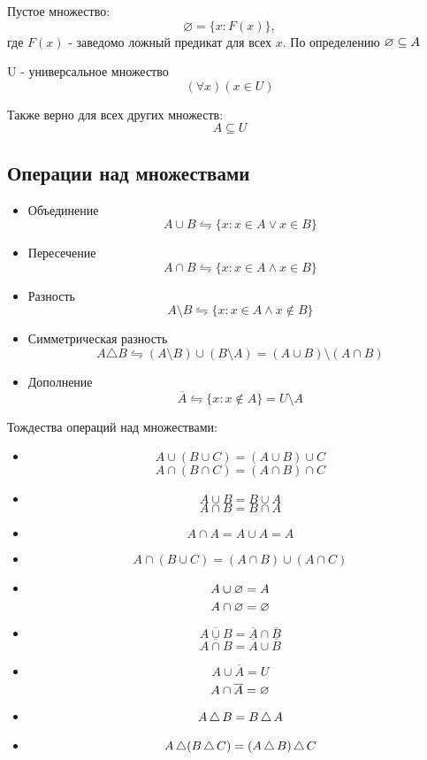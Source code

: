 \medskip

\begin{definition}
Пустое множество:
\[
\varnothing = \{x: F(x)\},
\]
где $F(x)$ - заведомо ложный предикат для всех  $x$.
По определению $\varnothing \subseteq A$
\end{definition}


\begin{definition}
U - универсальное множество \[
	(\forall x)(x \in U)
\]

Также верно для всех других множеств: \[
A \subseteq U
\] 
\end{definition}

\subsection{Операции над множествами}
\begin{itemize}
\item Объединение \[
A \cup B \leftrightharpoons \{x: x \in A \lor x \in B\}
\]
\item Пересечение \[
A \cap B \leftrightharpoons \{x: x \in A \land x \in B\} 
\] 
\item Разность \[
A \setminus B \leftrightharpoons \{x: x \in A \land x \not\in B\} 
\]
\item Симметрическая разность \[
A \triangle B \leftrightharpoons (A\setminus B) \cup (B \setminus A) = (A \cup B) \setminus (A\cap B)
\] 
\item Дополнение \[
\overline{A} \leftrightharpoons \{x:x \not\in A\} = U \setminus A 
\] 
\end{itemize}

\medskip

Тождества операций над множествами:
\begin{itemize}
	\item \[
	A \cup (B \cup C) = (A \cup B) \cup C
	\]
	\[
	A \cap (B \cap C) = (A \cap B) \cap C
	\]
\item \[
A \cup B = B \cup A
\] 
\[
A \cap B = B \cap A
\]
\item \[
A \cap A = A \cup A = A
\] 
\item \[
A \cap (B \cup C) = (A \cap B) \cup (A \cap C)
\]
\item \[
A \cup \varnothing = A
\] 
\[
A \cap \varnothing = \varnothing
\]
\item \[
\overline{A \cup B} = \overline{A} \cap	\overline{B}
\] 
\[
\overline{A \cap B} = \overline{A} \cup \overline{B}
\] 
\item \[
A \cup \overline{A} = U
\] 
\[
A \cap \overline{A} = \varnothing
\] 
\item \[
A\operatorname{\triangle} B = B\operatorname{\triangle} A
\]
\item \[
A\operatorname{\triangle} (B \operatorname{\triangle} C) = (A\operatorname{\triangle} B)\operatorname{\triangle} C
\] 
\end{itemize}


